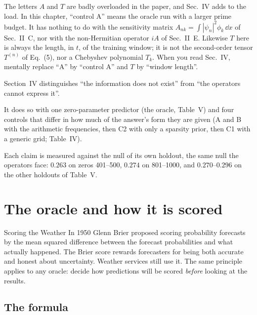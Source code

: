 \begin{pitfall}
The letters $A$ and $T$ are badly overloaded in the paper, and Sec.~IV adds to the load. In this chapter, ``control A'' means the oracle run with a larger prime budget. It has nothing to do with the sensitivity matrix $A_{nk}=\int|\psi_n|^2\phi_k\,\dd x$ of Sec.~II~C, nor with the non-Hermitian operator $iA$ of Sec.~II~E. Likewise $T$ here is always the length, in $t$, of the training window; it is not the second-order tensor $T^{(n)}$ of Eq.~(5), nor a Chebyshev polynomial $T_k$. When you read Sec.~IV, mentally replace ``A'' by ``control A'' and $T$ by ``window length''.
\end{pitfall}

\begin{keyideas}
\item Section~IV distinguishes ``the information does not exist'' from ``the operators cannot express it''.
\item It does so with one zero-parameter predictor (the oracle, Table~V) and four controls that differ in how much of the answer's form they are given (A and B with the arithmetic frequencies, then C2 with only a sparsity prior, then C1 with a generic grid; Table~IV).
\item Each claim is measured against the null of its own holdout, the same null the operators face: $0.263$ on zeros 401--500, $0.274$ on 801--1000, and $0.270$--$0.296$ on the other holdouts of Table~V.
\end{keyideas}

\section{The oracle and how it is scored}\label{sec:paper-arithmetic-oracle}
\begin{didyouknow}{Scoring the Weather}
In 1950 Glenn Brier proposed scoring probability forecasts by the mean squared difference between the forecast probabilities and what actually happened. The Brier score rewards forecasters for being both accurate and honest about uncertainty. Weather services still use it. The same principle applies to any oracle: decide how predictions will be scored \emph{before} looking at the results.
\end{didyouknow}

\subsection{The formula}

